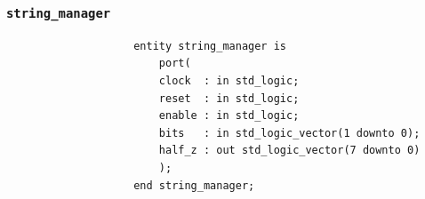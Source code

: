 \documentclass[11pt,a4paper]{article}
\begin{document}
            \subsubsection{\texttt{string\_manager}}
                \begin{verbatim}
                    entity string_manager is
                        port(
                        clock  : in std_logic;
                        reset  : in std_logic;
                        enable : in std_logic;
                        bits   : in std_logic_vector(1 downto 0);
                        half_z : out std_logic_vector(7 downto 0)
                        );
                    end string_manager;
                \end{verbatim}
\end{document}
